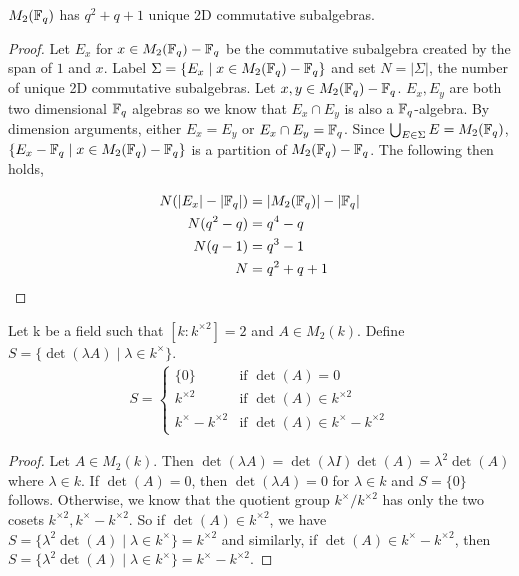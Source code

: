 \documentclass{amsart}
\begin{document}
\begin{theorem}\label{total-count}
    $M_2(\protect\mathbb{F}_q)$ has $q^2 + q + 1$ unique 2D commutative subalgebras.
\end{theorem}

\begin{proof}
    Let $E_x$ for $x \in M_2(\protect\mathbb{F}_q) - \protect\mathbb{F}_q$ be the commutative subalgebra created by the span of $1$ and $x$.
    Label $\Sigma = \{E_x \mid x \in M_2(\protect\mathbb{F}_q) - \protect\mathbb{F}_q \}$ and set $N = |\Sigma|$, the number of unique 2D commutative subalgebras. Let $x, y \in M_2(\protect\mathbb{F}_q) - \protect\mathbb{F}_q$. $E_x, E_y$ are both two dimensional $\protect\mathbb{F}_q$ algebras so we know that $E_x \cap E_y$ is also a $\protect\mathbb{F}_q$-algebra. By dimension arguments, either $E_x = E_y$ or $E_x \cap E_y = \protect\mathbb{F}_q$. Since $\bigcup_{E \in \Sigma}E = M_2(\protect\mathbb{F}_q)$, $\{E_x - \protect\mathbb{F}_q \mid x \in M_2(\protect\mathbb{F}_q) - \protect\mathbb{F}_q \}$ is a partition of $M_2(\protect\mathbb{F}_q) - \protect\mathbb{F}_q$. The following then holds,

    \begin{align*}
        N ( | E_x | - | \protect\mathbb{F}_q | ) &= | M_2(\protect\mathbb{F}_q) | - | \protect\mathbb{F}_q | \\
        N(q^2 - q) &= q^4 - q \\
        N(q-1) &= q^3 - 1 \\
        N &= q^2 + q + 1
    \end{align*}
    
    \end{proof} 

    \begin{lemma}\label{square-quotient-cosets}
    Let k be a field such that $\left[k : k^{\times2}\right] = 2$ and $A \in M_2(k)$. Define $S = \{\det( \lambda A ) \mid \lambda \in k^{\times} \}$.  \begin{align*}
        S =
        \begin{cases}
            \{0\}                     &\text{if } \det(A) = 0 \\
            k^{\times2}              &\text{if } \det(A) \in k^{\times2} \\
            k^{\times} - k^{\times2} &\text{if } \det(A) \in k^{\times} - k^{\times2}
        \end{cases}
    \end{align*}
\end{lemma}
\begin{proof}
    Let $A \in M_2(k)$. Then $\det(\lambda A) = \det(\lambda I)\det(A) = \lambda^2\det(A)$ where $\lambda \in k$.  If $\det(A) = 0$, then $\det(\lambda A) = 0$ for $\lambda \in k$ and $S = \{0\}$ follows. Otherwise, we know that the quotient group $k^{\times}/k^{\times2}$ has only the two cosets $k^{\times2}, k^{\times} - k^{\times2}$. So if $\det(A) \in k^{\times2}$, we have $S = \{\lambda^2 \det(A) \mid \lambda \in k^{\times}\} = k^{\times2}$ and similarly, if $\det(A) \in k^{\times} - k^{\times2}$, then $S = \{\lambda^2 \det(A) \mid \lambda \in k^{\times}\} = k^{\times} - k^{\times2}$.
\end{proof}
\end{document}
